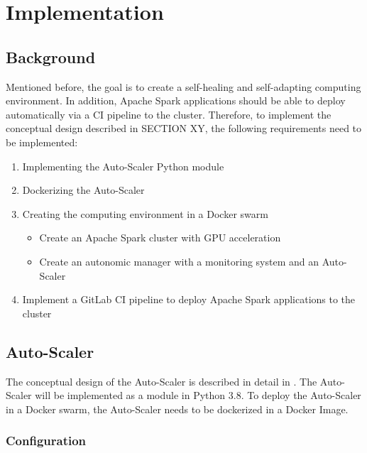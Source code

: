 \chapter{Implementation}
\label{chap:06_implementation}


\section{Background}
Mentioned before, the goal is to create a self-healing and self-adapting computing environment. In addition, Apache Spark applications  should be able to deploy automatically via a CI pipeline to the cluster. Therefore, to implement the conceptual design described in SECTION XY, the following requirements need to be implemented:

\begin{enumerate}
\item Implementing the Auto-Scaler Python module
\item Dockerizing the Auto-Scaler
\item Creating the computing environment in a Docker swarm
\begin{itemize}
\item Create an Apache Spark cluster with GPU acceleration
\item Create an autonomic manager with a monitoring system and an Auto-Scaler
\end{itemize}
\item Implement a GitLab CI pipeline to deploy Apache Spark applications to the cluster
\end{enumerate}


\section{Auto-Scaler}
The conceptual design of the Auto-Scaler is described in detail in . 
The Auto-Scaler will be implemented as a module in Python 3.8.
To deploy the Auto-Scaler in a Docker swarm, the Auto-Scaler needs to be dockerized in a Docker Image.


%
%

\subsection{Configuration}
